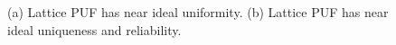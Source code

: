 
\begin{figure} 
    \centering
    \hfill
  \caption{(a) Lattice PUF has near ideal uniformity. (b) Lattice PUF has near ideal uniqueness and reliability.}
  \label{fig: lattice_puf_stats} 
\end{figure}


